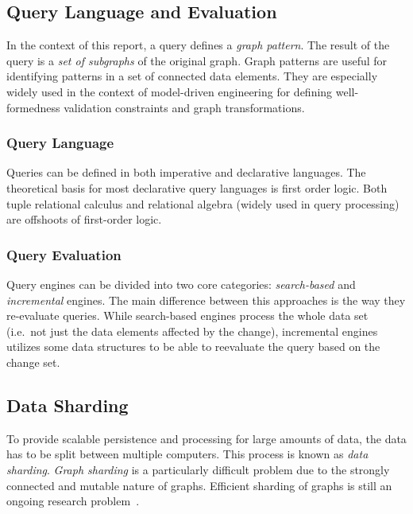 \subsection{Query Language and Evaluation}

In the context of this report, a query defines a \emph{graph pattern}. The result of the query is a \emph{set of subgraphs} of the original graph. Graph patterns are useful for identifying patterns in a set of connected data elements. They are especially widely used in the context of model-driven engineering for defining well-formedness validation constraints and graph transformations.

\subsubsection{Query Language}

Queries can be defined in both imperative and declarative languages. The theoretical basis for most declarative query languages is first order logic. Both tuple relational calculus and relational algebra (widely used in query processing) are offshoots of first-order logic.

\subsubsection{Query Evaluation}

Query engines can be divided into two core categories: \emph{search-based} and \emph{incremental} engines. The main difference between this approaches is the way they re-evaluate queries. While search-based engines process the whole data set (i.e.\ not just the data elements affected by the change), incremental engines utilizes some data structures to be able to reevaluate the query based on the change set.

\subsection{Data Sharding}
 
To provide scalable persistence and processing for large amounts of data, the data has to be split between multiple computers. This process is known as \emph{data sharding}. \emph{Graph sharding} is a particularly difficult problem due to the strongly connected and mutable nature of graphs. Efficient sharding of graphs is still an ongoing research problem~\cite{ShardingGraph}.



